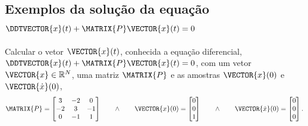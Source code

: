 \subsection{Exemplos da solução da equação $\DDTVECTOR{x}(t) + \MATRIX{P} \VECTOR{x}(t)=0$}

\begin{example}
\label{ex:ddxPx:0}
Calcular o vetor $\VECTOR{x}(t)$,
conhecida a equação diferencial, $\DDTVECTOR{x}(t) + \MATRIX{P} \VECTOR{x}(t)=0$, com 
um vetor $\VECTOR{x} \in \mathbb{R}^{N}$, uma matriz $\MATRIX{P}$ e as amostras $\VECTOR{x}(0)$ e $\VECTOR{\dot{x}}(0)$,
\begin{equation}
\MATRIX{P}=
\begin{bmatrix}
3 & -2 & 0\\
-2 & 3 & -1\\
0 & -1 & 1
\end{bmatrix}
\qquad \wedge \qquad
\VECTOR{x}(0)=
\begin{bmatrix}
0\\
0\\
1
\end{bmatrix}
\qquad \wedge \qquad
\VECTOR{\dot{x}}(0)=
\begin{bmatrix}
0\\
0\\
0
\end{bmatrix}.
\end{equation}
\end{example}

